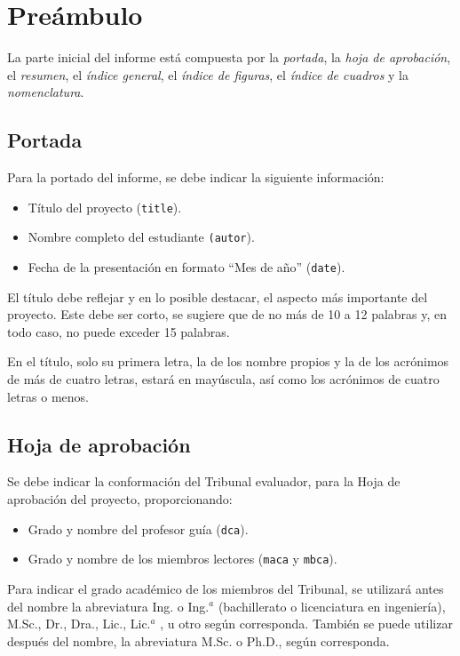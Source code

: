 \section{Preámbulo}
La parte inicial del informe está compuesta por la \emph{portada}, la \emph{hoja de aprobación}, el \emph{resumen}, el \emph{índice general}, el \emph{índice de figuras}, el \emph{índice de cuadros} y la \emph{nomenclatura}.

\subsection{Portada}
Para la portado del informe, se debe indicar la siguiente información:
\begin{itemize}
	\item Título del proyecto (\texttt{title}).
	\item Nombre completo del estudiante \texttt{(autor}).
	\item Fecha de la presentación en formato ``Mes de año'' (\texttt{date}).
\end{itemize}

El título debe reflejar y en lo posible destacar, el aspecto más importante del proyecto.  Este debe ser corto, se sugiere que de no más de 10 a 12 palabras y, en todo caso, no puede exceder 15 palabras.

En el título, solo su primera letra, la de los nombre propios y la de los acrónimos de más de cuatro letras, estará en mayúscula, así como los acrónimos de cuatro letras o menos.

\subsection{Hoja de aprobación}
Se debe indicar la conformación del Tribunal evaluador, para la Hoja de aprobación del proyecto, proporcionando:
\begin{itemize}
	\item Grado y nombre del profesor guía (\texttt{dca}).
	\item Grado y nombre de los miembros lectores (\texttt{maca} y \texttt{mbca}).
\end{itemize}

Para indicar el grado académico de los miembros del Tribunal, se utilizará antes del nombre la abreviatura Ing. o Ing.$^a$ (bachillerato o licenciatura en ingeniería), M.Sc., Dr., Dra., Lic., Lic.$^a$ , u otro según corresponda.  También se puede utilizar después del nombre, la abreviatura M.Sc. o Ph.D., según corresponda.

